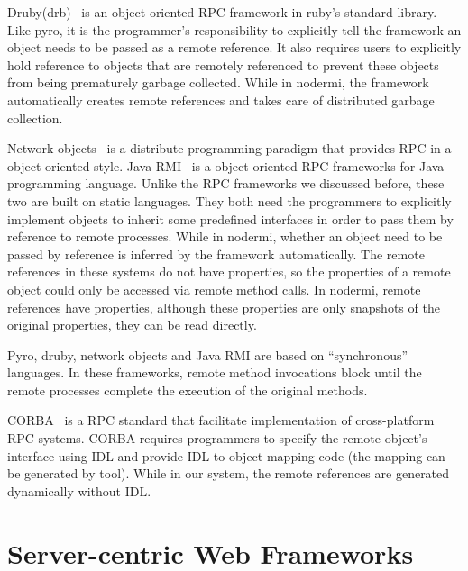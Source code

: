 Druby(drb)~\cite{druby} is an object oriented RPC framework in ruby's standard
library. Like pyro, it is the programmer's responsibility to explicitly tell
the framework an object needs to be passed as a remote reference. It also
requires users to explicitly hold reference  to objects that are remotely
referenced  to prevent these objects from being prematurely garbage collected.
While in nodermi, the framework automatically creates remote references and
takes care of distributed garbage collection.



Network objects~\cite{birrell1993distributed} is a distribute programming
paradigm that provides RPC in a object oriented style. Java RMI~\cite{j2eedoc}
is a object oriented RPC frameworks for Java programming language. Unlike the
RPC frameworks we discussed before, these two are built on static languages.
They both need the programmers to explicitly implement objects to inherit some
predefined interfaces in order to pass them by reference to remote processes.
While in nodermi, whether an object need to be passed by reference is inferred
by the framework  automatically. The remote references in these systems do not
have properties, so the properties of a remote object could only be accessed
via remote method calls. In nodermi, remote references have properties,
although these properties are only snapshots of the original properties, they
can be read directly.


Pyro, druby, network objects and Java RMI are based on ``synchronous''
languages. In these frameworks, remote method invocations block until the
remote processes complete the execution of the original methods.


CORBA~\cite{vinoski1997corba} is a RPC standard that facilitate implementation
of cross-platform RPC systems. CORBA requires programmers to specify  the
remote object's interface using IDL and provide IDL to object mapping code
(the mapping can be generated by tool). While in our system, the remote
references are generated dynamically without IDL.

\section{Server-centric Web Frameworks}

